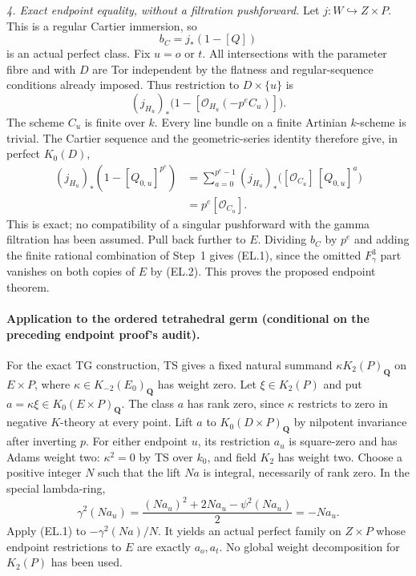 \emph{4. Exact endpoint equality, without a filtration pushforward.}
Let $j:W\hookrightarrow Z\times P$.  This is a regular Cartier
immersion, so
\[
                         b_C=j_*(1-[Q])
\]
is an actual perfect class.  Fix $u=o$ or $t$.  All intersections
with the parameter fibre and with $D$ are Tor independent by the
flatness and regular-sequence conditions already imposed.  Thus
restriction to $D\times\{u\}$ is
\[
       (j_{H_u})_*\bigl(1-[\mathcal O_{H_u}(-p^e C_u)]\bigr).
\]
The scheme $C_u$ is finite over $k$.  Every line bundle on a finite
Artinian $k$-scheme is trivial.  The Cartier sequence and the
geometric-series identity therefore give, in perfect $K_0(D)$,
\begin{align*}
 (j_{H_u})_*(1-[Q_{0,u}]^{p^e})
 &=\sum_{a=0}^{p^e-1}(j_{H_u})_*
                   \bigl([\mathcal O_{C_u}]\,[Q_{0,u}]^a\bigr)\\
 &=p^e[\mathcal O_{C_u}].
\end{align*}
This is exact; no compatibility of a singular pushforward with
the gamma filtration has been assumed.  Pull back further to $E$.
Dividing $b_C$ by $p^e$ and adding the finite rational combination
of Step~1 gives (EL.1), since the omitted $F_\gamma^3$ part vanishes
on both copies of $E$ by (EL.2).  This proves the proposed endpoint
theorem.

\paragraph{Application to the ordered tetrahedral germ
(conditional on the preceding endpoint proof's audit).}
For the exact TG construction, TS gives a fixed natural summand
$\kappa K_2(P)_{\mathbf Q}$ on $E\times P$, where
$\kappa\in K_{-2}(E_0)_{\mathbf Q}$ has weight zero.  Let
$\xi\in K_2(P)$ and put $a=\kappa\xi\in K_0(E\times P)_{\mathbf Q}$.
The class $a$ has rank zero, since $\kappa$ restricts to zero in
negative $K$-theory at every point.  Lift $a$ to
$K_0(D\times P)_{\mathbf Q}$ by nilpotent invariance
after inverting $p$\citep[Theorem A]{rootGeisserHesselholt2011}.
For either endpoint $u$, its restriction $a_u$ is square-zero and
has Adams weight two: $\kappa^2=0$ by TS over $k_0$, and field
$K_2$ has weight two.  Choose a positive integer $N$ such that the
lift $Na$ is integral, necessarily of rank zero.  In the special lambda-ring,
\[
 \gamma^2(Na_u)
   =\frac{(Na_u)^2+2Na_u-\psi^2(Na_u)}2=-Na_u.
\]
Apply (EL.1) to $-\gamma^2(Na)/N$.  It yields an actual perfect
family on $Z\times P$ whose endpoint restrictions to $E$ are
exactly $a_o,a_t$.  No global weight decomposition for $K_2(P)$
has been used.

